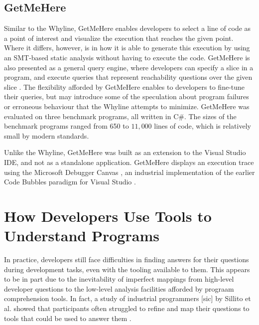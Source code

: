 \subsection{GetMeHere}
\label{subsec:GetMeHere}

\par Similar to the Whyline, GetMeHere enables developers to select a line of 
code as a point of interest and visualize the execution that reaches the given 
point.
Where it differs, however, is in how it is able to generate this execution
by using an SMT-based static analysis \cite{barnett-2014-get} without having to
execute the code.
GetMeHere is also presented as a general query engine, where developers can
specify a slice in a program, and execute queries that represent reachability
questions over the given slice \cite{barnett-2014-get}.
The flexibility afforded by GetMeHere enables to developers to fine-tune their
queries, but may introduce some of the speculation about program failures or
erroneous behaviour that the Whyline attempts to minimize.
GetMeHere was evaluated on three benchmark programs, all written in C\#.
The sizes of the benchmark programs ranged from 650 to $11,000$ lines of code,
which is relatively small by modern standards.

\par Unlike the Whyline, GetMeHere was built as an extension to the Visual
Studio \ac{IDE}, and not as a standalone application.
GetMeHere displays an execution trace using the Microsoft Debugger Canvas 
\cite{bragdon-2012-canvas}, an industrial implementation of the earlier 
Code Bubbles \cite{bragdon-2010-code-bubbles} paradigm for Visual Studio
\cite{barnett-2014-get}.

\section{How Developers Use Tools to Understand Programs}
\label{sec:HowDevelopersUseToolsToUnderstandPrograms}

\noindent In practice, developers still face difficulties in finding answers 
for their questions during development tasks, even with the tooling available 
to them.
This appears to be in part due to the inevitability of imperfect mappings from
high-level developer questions to the low-level analysis facilities afforded
by prograam comprehension tools.
In fact, a study of industrial programmers [sic] by Sillito et al. showed that 
participants often struggled to refine and map their questions to tools
that could be used to answer them \cite{sillito-2006-questions-during-task}.

